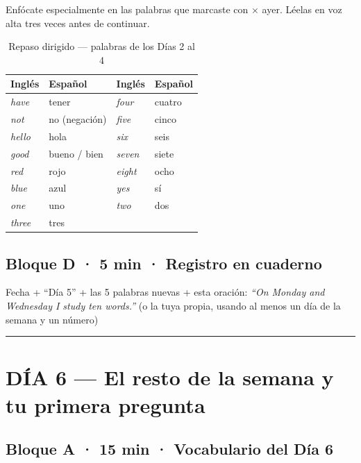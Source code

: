 \noindent
Enfócate especialmente en las palabras que marcaste con $\times$
ayer. Léelas en voz alta tres veces antes de continuar.

\begin{table}[htbp]
  \centering
  \caption{Repaso dirigido — palabras de los Días 2 al 4}
  \label{tab:repaso_dia5}
  \small
  \begin{tabular}{@{}llll@{}}
    \toprule
    \textbf{Inglés} & \textbf{Español} &
    \textbf{Inglés} & \textbf{Español} \\
    \midrule
    \textit{have}  & tener &
    \textit{four}  & cuatro \\
    \textit{not}   & no (negación) &
    \textit{five}  & cinco \\
    \textit{hello} & hola &
    \textit{six}   & seis \\
    \textit{good}  & bueno / bien &
    \textit{seven} & siete \\
    \textit{red}   & rojo &
    \textit{eight} & ocho \\
    \textit{blue}  & azul &
    \textit{yes}   & sí \\
    \textit{one}   & uno &
    \textit{two}   & dos \\
    \textit{three} & tres & & \\
    \bottomrule
  \end{tabular}
\end{table}

\subsection*{Bloque D · 5 min · Registro en cuaderno}

\noindent
Fecha + ``Día 5'' + las 5 palabras nuevas + esta oración:
\textit{``On Monday and Wednesday I study ten words.''}
(o la tuya propia, usando al menos un día de la semana y un número)

\bigskip
\noindent\rule{\textwidth}{0.4pt}

\section*{DÍA 6 — El resto de la semana y tu primera pregunta}
\label{sec:dia6}

\subsection*{Bloque A · 15 min · Vocabulario del Día 6}

